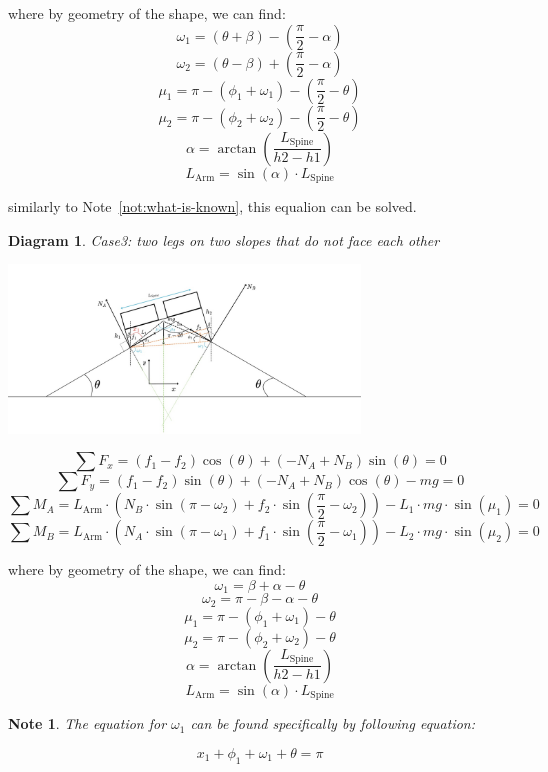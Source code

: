 \documentclass[11pt]{article}
\newtheorem{diagram}[statement]{Diagram}
\newtheorem{note}[statement]{Note}
\begin{document}
where by geometry of the shape, we can find:
\[\omega_1 = (\theta + \beta)  - (\frac{\pi}{2}-\alpha) \]
\[\omega_2 = (\theta - \beta) + (\frac{\pi}{2}-\alpha) \]
\[\mu_1 = \pi-(\phi_1+\omega_1)-(\frac{\pi}{2}-\theta) \]
\[\mu_2 = \pi-(\phi_2+\omega_2)-(\frac{\pi}{2}-\theta) \]
\[\alpha = \arctan(\frac{L_\text{Spine}}{h2-h1}) \]
\[L_\text{Arm} = \sin(\alpha) \cdot L_\text{Spine}\]

similarly to Note~\ref{not:what-is-known}, this equalion can be solved.

\begin{diagram}
    Case3: two legs on two slopes that do not face each other
\end{diagram}
\vspace{1ex} %
\begin{center}
    \includegraphics[width=0.7\textwidth]{figs/Case3.jpg} %
\end{center}

\[ \sum F_x = (f_1-f_2)\cos(\theta) + (-N_A+N_B) \sin(\theta) = 0 \]
\[ \sum F_y = (f_1-f_2)\sin(\theta) + (-N_A+N_B) \cos(\theta) - mg = 0 \]
\[ \sum M_A =  L_\text{Arm} \cdot (N_B \cdot \sin(\pi-\omega_2) + f_2 \cdot \sin(\frac{\pi}{2}-\omega_2)) - L_1\cdot mg \cdot \sin(\mu_1)= 0 \]
\[ \sum M_B =  L_\text{Arm} \cdot (N_A \cdot \sin(\pi-\omega_1) + f_1 \cdot \sin(\frac{\pi}{2}-\omega_1)) - L_2\cdot mg \cdot \sin(\mu_2)= 0 \]

where by geometry of the shape, we can find:
\[\omega_1 = \beta + \alpha - \theta\]
\[\omega_2 =  \pi - \beta - \alpha - \theta\]
\[\mu_1 = \pi-(\phi_1+\omega_1)-\theta \]
\[\mu_2 = \pi-(\phi_2+\omega_2)-\theta \]
\[\alpha = \arctan(\frac{L_\text{Spine}}{h2-h1}) \]
\[L_\text{Arm} = \sin(\alpha) \cdot L_\text{Spine}\]

\begin{note}
The equation for \(\omega_1\)  can be found specifically by following equation:
\end{note}
\begin{equation}
x_1 + \phi_1 + \omega_1 + \theta = \pi
\end{equation}
\end{document}
